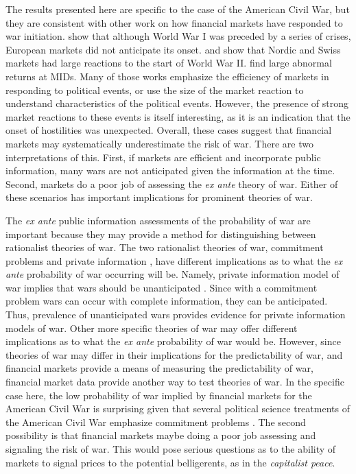 \documentclass[]{article}\usepackage[]{graphicx}\usepackage[]{color}
\begin{document}
The results presented here are specific to the case of the American Civil War, but they are consistent with other work on how financial markets have responded to war initiation.
\textcite{Ferguson2006} show that although World War I was preceded by a series of crises, European markets did not anticipate its onset.
\textcite{FreyKucher2000} and \textcite{WaldenstromFrey2008} show that Nordic and Swiss markets had large reactions to the start of World War II.
\textcite{GuidolinLaFerrara2010} find large abnormal returns at MIDs.
Many of those works emphasize the efficiency of markets in responding to political events, or use the size of the market reaction to understand characteristics of the political events.
However, the presence of strong market reactions to these events is itself interesting, as it is an indication that the onset of hostilities was unexpected.
Overall, these cases suggest that financial markets may systematically underestimate the risk of war.
There are two interpretations of this.
First, if markets are efficient and incorporate public information, many wars are not anticipated given the information at the time.
Second, markets do a poor job of assessing the \textit{ex ante} theory of war.
Either of these scenarios has important implications for prominent theories of war.

The \textit{ex ante} public information assessments of the probability of war are important because they may provide a method for distinguishing between rationalist theories of war.
The two rationalist theories of war, commitment problems and private information \parencites{Fearon1995,Powell2006}, have different implications as to what the \textit{ex ante} probability of war occurring will be.
Namely, private information model of war implies that wars should be unanticipated \parencite{Gartzke1999}.
Since with a commitment problem wars can occur with complete information, they can be anticipated.
Thus, prevalence of unanticipated wars provides evidence for private information models of war.
Other more specific theories of war may offer different implications as to what the \textit{ex ante} probability of war would be.
However, since theories of war may differ in their implications for the predictability of war, and financial markets provide a means of measuring the predictability of war, financial market data provide another way to test theories of war.
In the specific case here, the low probability of war implied by financial markets for the American Civil War is surprising given that several political science treatments of the American Civil War emphasize commitment problems \parencites{Reiter2009}{Weingast1998}{Poast2012}.
The second possibility is that financial markets maybe doing a poor job assessing and signaling the risk of war.
This would pose serious questions as to the ability of markets to signal prices to the potential belligerents, as in the \textit{capitalist peace}.

\printbibliography{}
\end{document}
